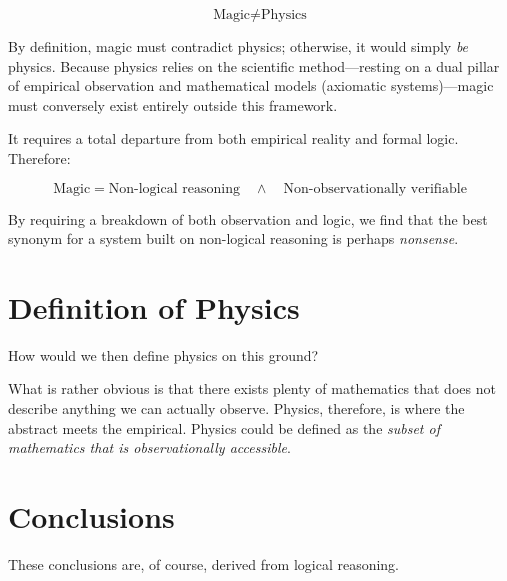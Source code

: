 \[
\text{Magic} \neq \text{Physics}
\]

By definition, magic must contradict physics; otherwise, it would simply \emph{be} physics.
Because physics relies on the scientific method—resting on a dual pillar of empirical observation and mathematical models (axiomatic systems)—magic must conversely exist entirely outside this framework. 

It requires a total departure from both empirical reality and formal logic. Therefore:

\[
\text{Magic} = \text{Non-logical reasoning} \quad \land \quad \text{Non-observationally verifiable}
\]

By requiring a breakdown of both observation and logic, we find that the best synonym for a system built on non-logical reasoning is perhaps \emph{nonsense}.



\section{Definition of Physics}

How would we then define physics on this ground?

What is rather obvious is that there exists plenty of mathematics that does not describe anything we can actually observe.
Physics, therefore, is where the abstract meets the empirical.  Physics could be defined as the \emph{subset of mathematics that is observationally accessible}.


\section{Conclusions}

These conclusions are, of course, derived from logical reasoning. 
